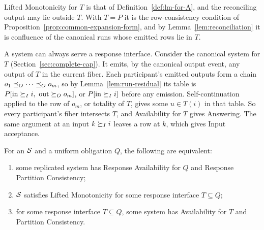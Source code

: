 Lifted Monotonicity for $T$ is that of Definition~\ref{def:lm-for-A}, and
the reconciling output may lie outside $T$.  With $T=P$ it is the
row-consistency condition of Proposition~\ref{prop:common-expansion-form}, and
by Lemma~\ref{lem:reconciliation} it is confluence of the canonical runs whose
emitted rows lie in $T$.

A system can always serve a response interface.  Consider the canonical system
for $T$ (Section~\ref{sec:complete-cap}).  It emits, by the canonical output
event, any output of $T$ in the current fiber.  Each participant's emitted
outputs form a chain $o_1\preceq_O\cdots\preceq_O o_m$, so by
Lemma~\ref{lem:run-residual} its table is
$P[\mathrm{in}\InputGe i,\ \mathrm{out}\OutputGe o_m]$, or
$P[\mathrm{in}\succeq_I i]$ before any emission.  Self-continuation applied to
the row of $o_m$, or totality of $T$, gives some $u\in T(i)$ in that table.
So every participant's fiber intersects $T$, and Availability for $T$ gives
Answering.  The same argument at an input $k\succeq_I i$ leaves a row at $k$,
which gives Input acceptance.

\begin{theorem}
\label{thm:complete-cap-response}
For an \spectype $\mathcal{S}$ and a uniform obligation $Q$,
the following are equivalent:
\begin{enumerate}
  \item some replicated system has Response Availability for $Q$ and
        Response Partition Consistency;
  \item $\mathcal{S}$ satisfies Lifted Monotonicity for some response interface $T\subseteq Q$;
  \item for some response interface $T\subseteq Q$, some system has
        Availability for $T$ and Partition Consistency.
\end{enumerate}
\end{theorem}

